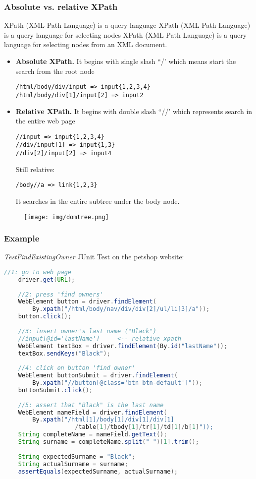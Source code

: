 \documentclass[a4paper, 10pt, titlepage]{article}
\begin{document}
\subsubsection*{Absolute vs. relative XPath}
XPath (XML Path Language) is a query language XPath (XML Path Language) is a query language for selecting nodes XPath (XML Path Language) is a query language for selecting nodes from an XML document. 
\begin{itemize}
\item \textbf{Absolute XPath.} It begins with single slash “/’ which means start the search from the root node
\begin{verbatim}
/html/body/div/input => input{1,2,3,4}
/html/body/div[1]/input[2] => input2
\end{verbatim}
\item \textbf{Relative XPath.} It begins with double slash “//’ which represents search in the entire web page
\begin{verbatim}
//input => input{1,2,3,4}
//div/input[1] => input{1,3}
//div[2]/input[2] => input4
\end{verbatim}
Still relative:
\begin{verbatim}
/body//a => link{1,2,3}
\end{verbatim}
It searches in the entire subtree under the body node.
\end{itemize}
\begin{figure}[h]
\centering
\texttt{[image: img/domtree.png]}
\end{figure}
\subsubsection*{Example}
\textit{TestFindExistingOwner} JUnit Test on the petshop website:

\begin{lstlisting}[language=java]
	//1: go to web page
	driver.get(URL);
	
	//2: press 'find owners'
	WebElement button = driver.findElement(
		By.xpath("/html/body/nav/div/div[2]/ul/li[3]/a"));
	button.click();
	
	//3: insert owner's last name ("Black")
	//input[@id='lastName']		<-- relative xpath
	WebElement textBox = driver.findElement(By.id("lastName"));
	textBox.sendKeys("Black");
	
	//4: click on button 'find owner'
	WebElement buttonSubmit = driver.findElement(
		By.xpath("//button[@class='btn btn-default']"));
	buttonSubmit.click();
		
	//5: assert that "Black" is the last name
	WebElement nameField = driver.findElement(
		By.xpath("/html[1]/body[1]/div[1]/div[1]
					/table[1]/tbody[1]/tr[1]/td[1]/b[1]"));
	String completeName = nameField.getText();
	String surname = completeName.split(" ")[1].trim();
		
	String expectedSurname = "Black";
	String actualSurname = surname;
	assertEquals(expectedSurname, actualSurname);
\end{lstlisting}
\end{document}
